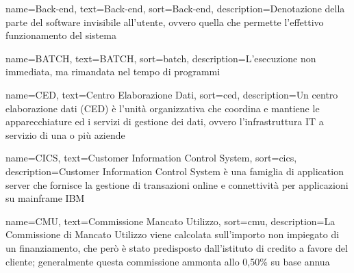 
%
%



{
    name=Back-end,
    text=Back-end,
    sort=Back-end,
    description={Denotazione della parte del software invisibile all'utente, ovvero quella che permette l'effettivo funzionamento del sistema}
}

{
    name=BATCH,
    text=BATCH,
    sort=batch,
    description={L'esecuzione non immediata, ma rimandata nel tempo di programmi}
}

{
    name=CED,
    text=Centro Elaborazione Dati,
    sort=ced,
    description={Un centro elaborazione dati (CED) è l'unità organizzativa che coordina e mantiene le apparecchiature ed i servizi di gestione dei dati, ovvero l'infrastruttura IT a servizio di una o più aziende}
}

{
    name=CICS,
    text=Customer Information Control System,
    sort=cics,
    description={Customer Information Control System è una famiglia di application server che fornisce la gestione di transazioni online e connettività per applicazioni su mainframe IBM}
}

{
    name=CMU,
    text=Commissione Mancato Utilizzo,
    sort=cmu,
    description={La Commissione di Mancato Utilizzo viene calcolata sull'importo non impiegato di un finanziamento, che però è stato predisposto dall'istituto di credito a favore del cliente; generalmente questa commissione ammonta allo 0,50\% su base annua}
}


